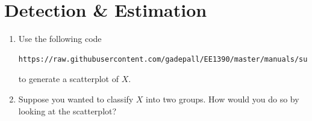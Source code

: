 \documentclass[journal,12pt,twocolumn]{IEEEtran}
\renewcommand\thesection{\arabic{section}}
\begin{document}
\section{Detection \& Estimation}
\begin{enumerate}[label=\thesection.\arabic*
,ref=\thesection.\theenumi]
%
%

%
\item Use the following code 
%
\begin{lstlisting}
https://raw.githubusercontent.com/gadepall/EE1390/master/manuals/supervised/linear_class/codes/2.3.py
\end{lstlisting}
%
to generate  a scatterplot of $X$.
%
\item Suppose you wanted to classify  $X$ into two groups.  How would you do so by looking at the scatterplot?
%

\end{enumerate}

%
\end{document}
